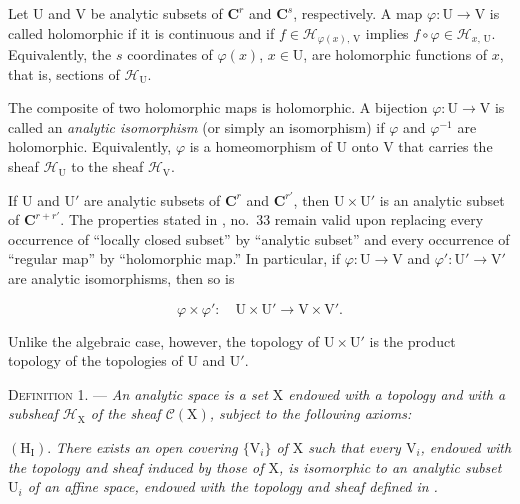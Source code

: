 Let $\mathrm{U}$ and $\mathrm{V}$ be analytic subsets of $\mathbf{C}^r$ and $\mathbf{C}^s$, respectively. A map $\varphi:\mathrm{U}\to\mathrm{V}$ is called holomorphic if it is continuous and if $f\in\mathcal{H}_{\varphi(x),\,\mathrm{V}}$ implies $f\circ\varphi\in\mathcal{H}_{x,\,\mathrm{U}}$.
%
Equivalently, the $s$ coordinates of $\varphi(x)$, $x\in\mathrm{U}$, are holomorphic functions of $x$, that is, sections of $\mathcal{H}_{\mathrm{U}}$.

The composite of two holomorphic maps is holomorphic. A bijection $\varphi:\mathrm{U}\to\mathrm{V}$ is called an \emph{analytic isomorphism} (or simply an isomorphism) if $\varphi$ and $\varphi^{-1}$ are holomorphic. Equivalently, $\varphi$ is a homeomorphism of $\mathrm{U}$ onto $\mathrm{V}$ that carries the sheaf $\mathcal{H}_{\mathrm{U}}$ to the sheaf $\mathcal{H}_{\mathrm{V}}$.

If $\mathrm{U}$ and $\mathrm{U}'$ are analytic subsets of $\mathbf{C}^r$ and $\mathbf{C}^{r'}$, then $\mathrm{U}\times\mathrm{U}'$ is an analytic subset of $\mathbf{C}^{r+r'}$. The properties stated in , no.~33 remain valid upon replacing every occurrence of ``locally closed subset'' by ``analytic subset'' and every occurrence of ``regular map'' by ``holomorphic map.'' In particular, if $\varphi:\mathrm{U}\to\mathrm{V}$ and $\varphi':\mathrm{U}'\to\mathrm{V}'$ are analytic isomorphisms, then so is

\begin{equation*}
\varphi\times\varphi':\quad \mathrm{U}\times\mathrm{U}'\longrightarrow\mathrm{V}\times\mathrm{V}'.
\end{equation*}

Unlike the algebraic case, however, the topology of $\mathrm{U}\times\mathrm{U}'$ is the product topology of the topologies of $\mathrm{U}$ and $\mathrm{U}'$.


\textsc{Definition 1}. --- \emph{An analytic space is a set $\mathrm{X}$ endowed with a topology and with a subsheaf $\mathcal{H}_{\mathrm{X}}$ of the sheaf $\mathcal{C}(\mathrm{X})$, subject to the following axioms:}

$(\mathrm{H}_{\mathrm{I}})$. \emph{There exists an open covering $\{\mathrm{V}_i\}$ of $\mathrm{X}$ such that every $\mathrm{V}_i$, endowed with the topology and sheaf induced by those of $\mathrm{X}$, is isomorphic to an analytic subset $\mathrm{U}_i$ of an affine space, endowed with the topology and sheaf defined in .}

